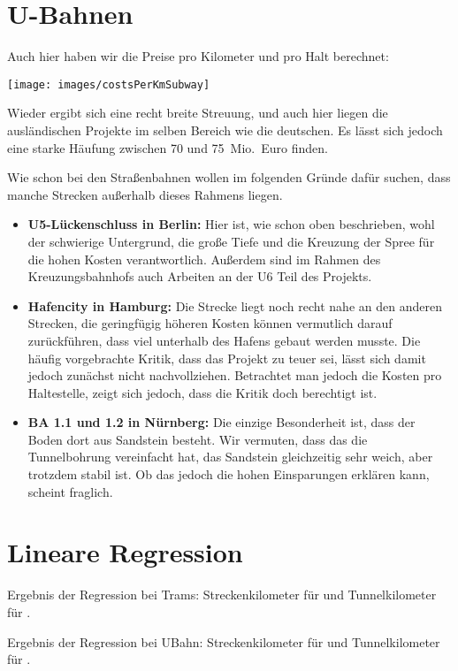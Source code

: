 \section{U-Bahnen}

Auch hier haben wir die Preise pro Kilometer und pro Halt berechnet:

\nopagebreak

\texttt{[image: images/costsPerKmSubway]}

Wieder ergibt sich eine recht breite Streuung, und auch hier liegen die ausländischen Projekte im selben Bereich wie die deutschen.
Es lässt sich jedoch eine starke Häufung zwischen 70 und 75{\ }Mio.{\ }Euro finden.

Wie schon bei den Straßenbahnen wollen im folgenden Gründe dafür suchen, dass manche Strecken außerhalb dieses Rahmens liegen.

\begin{itemize}
    \item \textbf{U5-Lückenschluss in Berlin:} Hier ist, wie schon oben beschrieben, wohl der schwierige Untergrund, die große Tiefe und die Kreuzung der Spree für die hohen Kosten verantwortlich. Außerdem sind im Rahmen des Kreuzungsbahnhofs auch Arbeiten an der U6 Teil des Projekts.
    \item \textbf{Hafencity in Hamburg:} Die Strecke liegt noch recht nahe an den anderen Strecken, die geringfügig höheren Kosten können vermutlich darauf zurückführen, dass viel unterhalb des Hafens gebaut werden musste. Die häufig vorgebrachte Kritik, dass das Projekt zu teuer sei, lässt sich damit jedoch zunächst nicht nachvollziehen. Betrachtet man jedoch die Kosten pro Haltestelle, zeigt sich jedoch, dass die Kritik doch berechtigt ist.
    \item \textbf{BA 1.1 und 1.2 in Nürnberg:} Die einzige Besonderheit ist, dass der Boden dort aus Sandstein besteht. Wir vermuten, dass das die Tunnelbohrung vereinfacht hat, das Sandstein gleichzeitig sehr weich, aber trotzdem stabil ist. Ob das jedoch die hohen Einsparungen erklären kann, scheint fraglich.
\end{itemize}


\section{Lineare Regression}



Ergebnis der Regression bei Trams: Streckenkilometer für \tramnormal und Tunnelkilometer für \tramtunnel.




Ergebnis der Regression bei UBahn: Streckenkilometer für \subwaynormal und Tunnelkilometer für \subwaytunnel.

